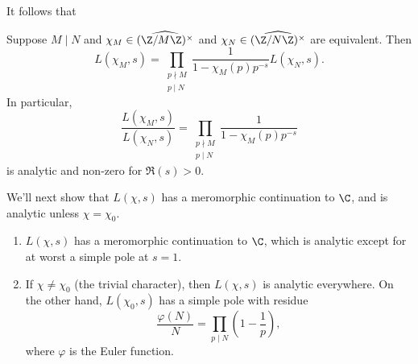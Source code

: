 \documentclass[a4paper]{article}
\begin{document}
It follows that
\begin{prop}
  Suppose $M \mid N$ and $\chi_M \in \widehat{(\Z/M\Z)^\times}$ and $\chi_N \in \widehat{(\Z/N\Z)^\times}$ are equivalent. Then
  \[
    L(\chi_M, s) = \prod_{\substack{p \nmid M\\ p \mid N}} \frac{1}{1 - \chi_M(p) p^{-s}} L(\chi_N, s).
  \]
  In particular,
  \[
    \frac{L(\chi_M, s)}{ L(\chi_N, s)} = \prod_{\substack{p \nmid M\\ p \mid N}} \frac{1}{1 - \chi_M(p) p^{-s}}
  \]
  is analytic and non-zero for $\Re(s) > 0$.
\end{prop}

We'll next show that $L(\chi, s)$ has a meromorphic continuation to $\C$, and is analytic unless $\chi = \chi_0$.

\begin{thm}\leavevmode
  \begin{enumerate}
    \item $L(\chi, s)$ has a meromorphic continuation to $\C$, which is analytic except for at worst a simple pole at $s = 1$.
    \item If $\chi \not= \chi_0$ (the trivial character), then $L(\chi, s)$ is analytic everywhere. On the other hand, $L(\chi_0, s)$ has a simple pole with residue
      \[
        \frac{\varphi(N)}{N} = \prod_{p \mid N} \left(1 - \frac{1}{p}\right),
      \]
      where $\varphi$ is the Euler function.
  \end{enumerate}
\end{thm}
\end{document}

